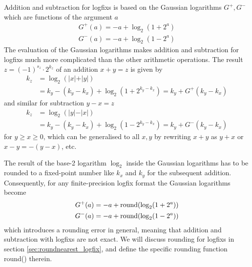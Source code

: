 Addition and subtraction for logfixs is based on the Gaussian logarithms $G^+,G^-$ which are functions of the argument $a$
\begin{align}
G^+(a) = -a + \log_2(1+2^a) \nonumber \\
G^-(a) = -a + \log_2(1-2^a)
\label{eq:gauss_log}
\end{align}
The evaluation of the Gaussian logarithms makes addition and subtraction for logfixs much more complicated than the other arithmetic operations.
The result $z = (-1)^{s_z} \cdot 2^{k_z}$ of an addition $x+y = z$ is given by
\begin{align}
k_z &= \log_2(\vert x \vert + \vert y \vert) \nonumber \\
	&= k_y - (k_y - k_x) + \log_2(1+2^{k_y - k_x})  = k_y + G^+(k_y-k_x)
\label{eq:logfix_add}
\end{align}
and similar for subtraction $y-x = z$
\begin{align}
k_z &= \log_2(\vert y \vert - \vert x \vert) \nonumber \\
	&= k_y - (k_y-k_x) + \log_2(1-2^{k_y - k_x}) = k_y + G^-(k_y-k_x)
\label{eq:logfix_sub}
\end{align}
for $y \geq x \geq 0$, which can be generalised to all $x,y$ by rewriting $x+y$ as $y+x$ or $x-y = -(y-x)$, etc.

The result of the base-2 logarithm $\log_2$ inside the Gaussian logarithms has to be rounded to a fixed-point
number like $k_x$ and $k_y$ for the subsequent addition. Consequently, for any finite-precision logfix format
the Gaussian logarithms become
\begin{align}
	G^+(a) = -a + \operatorname{round}(\log_2(1+2^a)) \nonumber \\
	G^-(a) = -a + \operatorname{round}(\log_2(1-2^a))
	\label{eq:gauss_log_round}
\end{align}
which introduces a rounding error in general, meaning that addition and subtraction with logfixs are not exact.
We will discuss rounding for logfixs in section \ref{sec:roundnearest_logfix}, and define the specific rounding function
round() therein.

